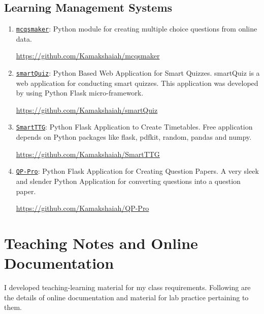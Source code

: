 \documentclass[10pt]{article}
\begin{document}
\subsection{Learning Management Systems}

\begin{multicols}{2}
\begin{enumerate}
	\item \texttt{\underline{mcqsmaker}}: Python module for creating multiple choice questions from online data.

\url{https://github.com/Kamakshaiah/mcqsmaker}

\item \texttt{\underline{smartQuiz}}: Python Based Web Application for Smart Quizzes. smartQuiz is a web application for conducting smart quizzes. This application was developed by using Python Flask micro-framework.

\url{https://github.com/Kamakshaiah/smartQuiz}

\item \texttt{\underline{SmartTTG}}: Python Flask Application to Create Timetables. Free application depends on Python packages like flask, pdfkit, random, pandas and numpy.

\url{https://github.com/Kamakshaiah/SmartTTG}

\item \texttt{\underline{QP-Pro}}: Python Flask Application for Creating Question Papers. A very sleek and slender Python Application for converting questions into a question paper.

\url{https://github.com/Kamakshaiah/QP-Pro}


\end{enumerate}
\end{multicols}


\section{\bfseries{Teaching Notes and Online Documentation}} \hline \vspace{0.5cm}

I developed teaching-learning material for my class requirements. Following are the details of online documentation and material for lab practice pertaining to them. 
\end{document}
